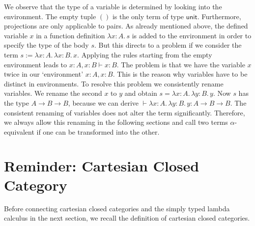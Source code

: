 \documentclass{article}
\newcommand{\type}{\vdash}
\newcommand{\unit}{\mathsf{unit}}
\begin{document}
We observe that the type of a variable is determined by looking into the environment.
The empty tuple $()$ is the only term of type $\unit$.
Furthermore, projections are only applicable to pairs.
As already mentioned above, the defined variable $x$ in a function definition $\lambda x: A.\, s$ is added to the environment
in order to specify the type of the body $s$.
But this directs to a problem if we consider the term $s := \lambda x: A.\,\lambda x: B.\,x$.
Applying the rules starting from the empty environment leads to $x: A, x: B \type x: B$.
The problem is that we have the variable $x$ twice in our `environment' $x: A, x: B$.
This is the reason why variables have to be distinct in environments.
To resolve this problem we consistently rename variables.
We rename the second $x$ to $y$ and obtain $s = \lambda x: A.\,\lambda y: B.\, y$.
Now $s$ has the type $A \to B \to B$, because we can derive $\type \lambda x: A.\,\lambda y: B.\, y: A \to B \to B$.
The consistent renaming of variables does not alter the term significantly.
Therefore, we always allow this renaming in the following sections
and call two terms $\alpha$-equivalent if one can be transformed into the other.


\section{Reminder: Cartesian Closed Category}

Before connecting cartesian closed categories and the simply typed lambda calculus in the next section,
we recall the definition of cartesian closed categories.
\end{document}
